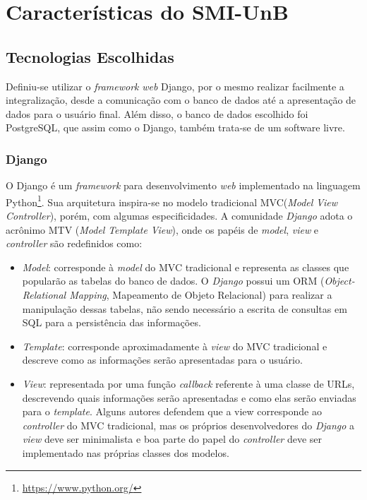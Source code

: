 \chapter{Características do SMI-UnB}

\section{Tecnologias Escolhidas}


Definiu-se utilizar o \textit{framework} \textit{web} Django, por o mesmo realizar facilmente a integralização, desde a comunicação com o banco de dados até a apresentação de dados para o usuário final. Além disso, o banco de dados escolhido foi PostgreSQL, que assim como o Django, também trata-se de um software livre.

    \subsection{Django}

    O Django \cite{django_project} é um \textit{framework} para desenvolvimento \textit{web} implementado na linguagem Python\footnote{\url{https://www.python.org/}}. Sua arquitetura inspira-se no modelo tradicional MVC(\textit{Model} \textit{View} \textit{Controller}), porém, com algumas especificidades. A comunidade \textit{Django} adota o acrônimo MTV (\textit{Model} \textit{Template} \textit{View}), onde os papéis de \textit{model}, \textit{view} e \textit{controller} são redefinidos como:
    \begin{itemize}
        \item \textit{Model}: corresponde à \textit{model} do MVC tradicional e representa as classes que popularão as tabelas do banco de dados. O \textit{Django} possui um ORM (\textit{Object-Relational Mapping}, Mapeamento de Objeto Relacional) para realizar a manipulação dessas tabelas, não sendo necessário a escrita de consultas em SQL para a persistência das informações.
        \item \textit{Template}: corresponde aproximadamente à \textit{view} do MVC tradicional e descreve como as informações serão apresentadas para o usuário.
        \item \textit{View}: representada por uma função \textit{callback} referente à uma classe de URLs, descrevendo quais informações serão apresentadas e como elas serão enviadas para o \textit{template}. Alguns autores defendem que a view corresponde ao \textit{controller} do MVC tradicional, mas os próprios desenvolvedores do \textit{Django} a \textit{view} deve ser minimalista e boa parte do papel do \textit{controller} deve ser implementado nas próprias classes dos modelos.
    \end{itemize}

